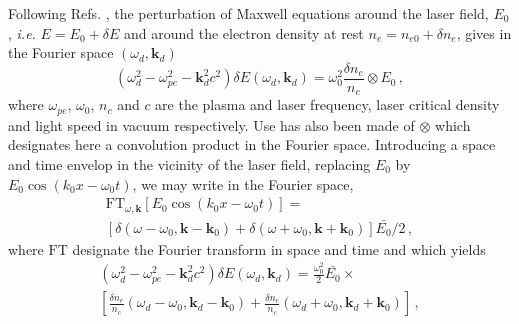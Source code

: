 \documentclass[
 reprint,
 amsmath,amssymb,
 aps,
]{revtex4-1}
\begin{document}
Following Refs. \cite[]{Akhiezer_fluctuations,phd_Michel}, the perturbation of Maxwell equations around the laser field, $E_0$, \emph{i.e.} $E = E_0 + \delta E$ and around the  electron density at rest $n_e = n_{e0}+\delta n_e$, gives in the Fourier space $(\omega_d,\mathbf{k}_d)$
\begin{equation}
    (\omega_d^2 - \omega_{pe}^2 -\mathbf{k}_d^2c^2)\delta E(\omega_d,\mathbf{k}_d) = \omega_0^2 \frac{\delta n_e }{n_c}\otimes E_0  \, ,\label{eq:max1}
\end{equation}
where $\omega_{pe}$, $\omega_{0}$,  $n_c$ and $c$ are the plasma and laser frequency, laser critical density and light speed in vacuum respectively. Use has also been made of $\otimes$ which designates  here a convolution product in the Fourier space.
Introducing a space and time envelop in the vicinity of the laser field, replacing $E_0$ by $E_0 \cos(k_0 x - \omega_0t)$,
we may write in the Fourier space,  
\begin{align}
   \mathrm{FT}_{\omega,\mathbf{k}}[ E_0 \cos(k_0 x - \omega_0t) ]= \nonumber\\ [ \delta(\omega-\omega_0, \mathbf{k}-\mathbf{k}_0) + \delta(\omega+\omega_0, \mathbf{k}+\mathbf{k}_0) ]\bar{E_0}/2 \, , 
\end{align}
where $\mathrm{FT}$ designate the Fourier transform in space and time and which yields 
\begin{align}
    (\omega_d^2 - \omega_{pe}^2 -\mathbf{k}_d^2c^2)\delta E(\omega_d,\mathbf{k}_d) = \frac{\omega_0^2}{2} \bar{E_0}\times \nonumber\\ \left[\frac{\delta n_e }{n_c}(\omega_d-\omega_0, \mathbf{k}_d-\mathbf{k}_0) +\frac{\delta n_e }{n_c}(\omega_d+\omega_0, \mathbf{k}_d+\mathbf{k}_0) \right] \, ,\label{eq:max2}
\end{align}
\end{document}
